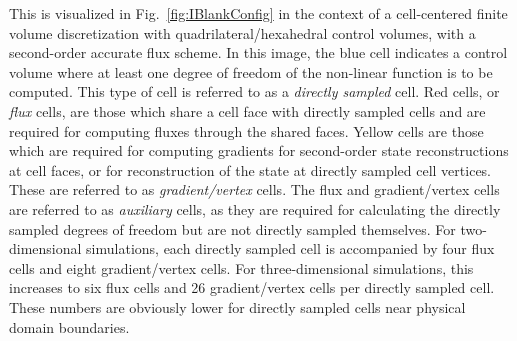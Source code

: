 This is visualized in Fig.~\ref{fig:IBlankConfig} in the context of a cell-centered finite volume discretization with quadrilateral/hexahedral control volumes, with a second-order accurate flux scheme. In this image, the blue cell indicates a control volume where at least one degree of freedom of the non-linear function is to be computed. This type of cell is referred to as a \textit{directly sampled} cell. Red cells, or \textit{flux} cells, are those which share a cell face with directly sampled cells and are required for computing fluxes through the shared faces. Yellow cells are those which are required for computing gradients for second-order state reconstructions at cell faces, or for reconstruction of the state at directly sampled cell vertices. These are referred to as \textit{gradient/vertex} cells. The flux and gradient/vertex cells are referred to as \textit{auxiliary} cells, as they are required for calculating the directly sampled degrees of freedom but are not directly sampled themselves. For two-dimensional simulations, each directly sampled cell is accompanied by four flux cells and eight gradient/vertex cells. For three-dimensional simulations, this increases to six flux cells and 26 gradient/vertex cells per directly sampled cell. These numbers are obviously lower for directly sampled cells near physical domain boundaries.

